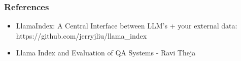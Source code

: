 
\begin{frame}[fragile]\frametitle{References}


\begin{itemize}
\item LlamaIndex: A Central Interface between LLM’s + your external data: https://github.com/jerryjliu/llama\_index
\item Llama Index and Evaluation of QA Systems - Ravi Theja

\end{itemize}


\end{frame}